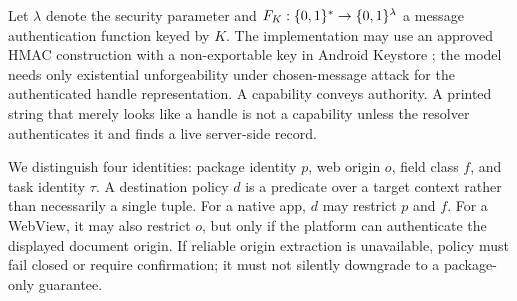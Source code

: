 Let $\lambda$ denote the security parameter and $F_K:\{0,1\}^*\rightarrow\{0,1\}^\lambda$ a message authentication function keyed by $K$. The implementation may use an approved HMAC construction \cite{rfc2104} with a non-exportable key in Android Keystore \cite{androidKeystore}; the model needs only existential unforgeability under chosen-message attack for the authenticated handle representation. A capability conveys authority. A printed string that merely looks like a handle is not a capability unless the resolver authenticates it and finds a live server-side record.

We distinguish four identities: package identity $p$, web origin $o$, field class $f$, and task identity $\tau$. A destination policy $d$ is a predicate over a target context rather than necessarily a single tuple. For a native app, $d$ may restrict $p$ and $f$. For a WebView, it may also restrict $o$, but only if the platform can authenticate the displayed document origin. If reliable origin extraction is unavailable, policy must fail closed or require confirmation; it must not silently downgrade to a package-only guarantee.


